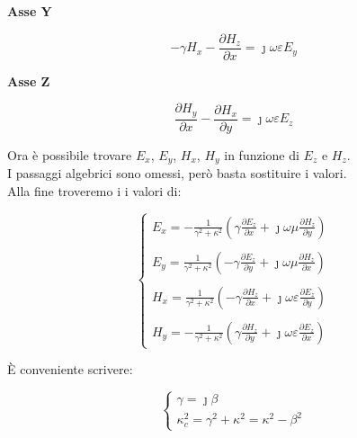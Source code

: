 \textbf{Asse Y} 

{
    \Large 
    \begin{equation}
        - \gamma H_x - \frac{\partial H_z}{\partial x}  
        = 
        \jmath \omega \varepsilon E_y
    \end{equation}
}



\textbf{Asse Z} 

{
    \Large 
    \begin{equation}
        \frac{\partial H_y}{\partial x} - \frac{\partial H_x}{\partial y} 
        = 
        \jmath \omega \varepsilon E_z
    \end{equation}
}

Ora è possibile trovare $E_x$, $E_y$, $H_x$, $H_y$ 
in funzione di $E_z$ e $H_z$. \\ 

I passaggi algebrici sono omessi, però basta sostituire i valori. \\ 

Alla fine troveremo i i valori di: 

{
    \Large 
    \begin{equation}
        \begin{cases}
            E_x = - \frac{1}{\gamma ^{2} + \kappa ^{2}} (\gamma \frac{\partial E_z}{\partial x} + \jmath \omega \mu \frac{\partial H_z}{\partial y}) \\ \\ 
            E_y =  \frac{1}{\gamma ^{2} + \kappa ^{2}} (- \gamma \frac{\partial E_z}{\partial y} + \jmath \omega \mu \frac{\partial H_z}{\partial x}) \\ \\ 
            H_x =  \frac{1}{\gamma ^{2} + \kappa ^{2}} (- \gamma \frac{\partial H_z}{\partial x} + \jmath \omega \varepsilon \frac{\partial E_z}{\partial y}) \\ \\ 
            H_y =  -\frac{1}{\gamma ^{2} + \kappa ^{2}} ( \gamma \frac{\partial H_z}{\partial y} + \jmath \omega \varepsilon \frac{\partial E_z}{\partial x}) 
        \end{cases}
    \end{equation}
}

È conveniente scrivere: 

{
    \Large
    \begin{equation}
        \begin{cases}
            \gamma = \jmath \beta \\ 
            \kappa_c ^{2} = \gamma^{2} + \kappa^{2} = \kappa^{2} - \beta^{2} 
        \end{cases}
    \end{equation}
}



